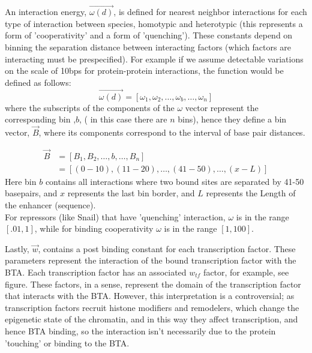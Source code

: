 An interaction energy,  $\overrightarrow{\omega(d)}$, is defined for nearest neighbor interactions for each type of interaction between species, homotypic and heterotypic (this represents a form of 'cooperativity' and a form of 'quenching').  These constants depend on binning the separation distance between interacting factors (which factors are interacting must be prespecified).  For example if we assume detectable variations on the scale of 10bps for protein-protein interactions, the function would be defined as follows:
\begin{equation}\label{}
   \overrightarrow{ \omega(d)} =  [ \omega_1 ,\omega_2 ,\ldots, \omega_b,\ldots,  \omega_n ]
\end{equation}
where the subscripts of the components of the $\omega$ vector represent the corresponding bin ,$b$, ( in this case there are $n$ bins), hence they define a bin vector, $\overrightarrow{B}$, where its components correspond to the interval of base pair distances.

\begin{equation}\label{}
\begin{split}
 \overrightarrow{B}   &= [ B_1 ,B_2 ,\ldots, b, \ldots, B_n ] \\
     &=   [ (0-10), (11-20), \ldots,(41-50),\ldots, (x-L)]
    \end{split}
\end{equation}
Here bin $b$ contains all interactions where two bound sites are separated by 41-50 basepairs, and $x$ represents the last bin border, and $L$ represents the Length of the enhancer (sequence). \\

For repressors (like Snail) that have 'quenching' interaction, $\omega$ is in the range $[.01,1]$, while for binding cooperativity $\omega$ is in the range $[1,100]$.

Lastly, $\overrightarrow{w}$, contains a post binding constant for each transcription factor.  These parameters represent the interaction of the bound transcription factor with the BTA.  Each transcription factor has an associated $w_{tf}$ factor, for example, see figure.  These factors, in a sense, represent the domain of the transcription factor that interacts with the BTA.  However, this interpretation is a controversial; as transcription factors recruit histone modifiers and remodelers, which change the epigenetic state of the chromatin, and in this way they affect transcription, and hence BTA binding, so the interaction isn't necessarily due to the protein 'touching' or binding to the BTA.  
  
